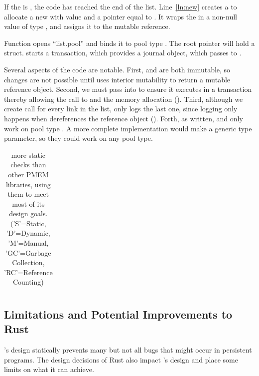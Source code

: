 If the  is , the code has reached the end of the list.  Line~\ref{ln:new} creates a  to allocate a new  with value  and a  pointer equal to .  It wraps the  in a non-null value of type , and assigns it to the mutable reference.


Function  opens ``list.pool'' and binds it to pool type .  The root pointer will hold a  struct.   starts a transaction, which provides a journal object, which  passes to .

Several aspects of the code are notable.  First,  and  are both immutable, so changes are not possible until  uses interior mutability to return a mutable reference object.  Second, we must pass  into  to ensure it executes in a transaction thereby allowing the call to   and the memory allocation ().  Third, although we create call  for every link in the list, \this{} only logs the last one, since logging only happens when  dereferences the reference object ().  Forth, as written,  and  only work on pool type .  A more complete implementation would make  a generic type parameter, so they could work on any pool type.

\newcommand{\Dynamic}{D}
\newcommand{\Static}{S}
\newcommand{\Manual}{M}

\begin{table}
  \center
  \footnotesize
  \begin{tabular}{|l|c|c|c|c|c|c|c|c|}\hline
    
  \end{tabular}
  \caption{\This{} more static checks than other PMEM libraries, using them to meet most of its design goals. ('S'=Static, 'D'=Dynamic, 'M'=Manual, 'GC'=Garbage Collection, 'RC'=Reference Counting)}
  \label{tab:libs}
  \vspace{-0.5cm}
\end{table}

\subsection{Limitations and Potential Improvements to Rust}
\label{sec:discuss}

\This{}'s design statically prevents many but not all bugs that might occur in
persistent programs.  The design decisions of Rust also impact \this{}'s design
and place some limits on what it can achieve.


